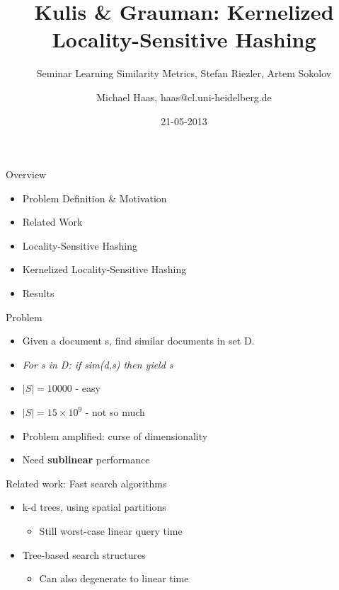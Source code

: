 \documentclass[12pt,a4paper]{beamer}
\author{Michael Haas, haas@cl.uni-heidelberg.de}
\title{Kulis \& Grauman: Kernelized Locality-Sensitive Hashing}
\subtitle{Seminar Learning Similarity Metrics, Stefan Riezler, Artem Sokolov}
\date{21-05-2013}
\begin{document}
\begin{frame}
\maketitle
\end{frame}

\begin{frame}{Overview}
\begin{itemize}
\item Problem Definition \& Motivation
\item Related Work
\item Locality-Sensitive Hashing
\item Kernelized Locality-Sensitive Hashing
\item Results
\end{itemize}
\end{frame}

\begin{frame}{Problem}
\begin{itemize}
\item Given a document s, find similar documents in set D.
\item \textit{For s in D: if sim(d,s) then yield s}
\item $|S| = 10000$ - easy
\item $|S| = 15 \times 10^9$ - not so much
\item Problem amplified: curse of dimensionality
\item Need \textbf{sublinear} performance
\end{itemize}
\end{frame}

\begin{frame}{Related work: Fast search algorithms}
\begin{itemize}
\item k-d trees, using spatial partitions
    \begin{itemize}
    \item Still worst-case linear query time
    \end{itemize}
\item Tree-based search structures
    \begin{itemize}
    \item Can also degenerate to linear time
    \end{itemize}
\end{itemize}
\end{frame}
\end{document}
